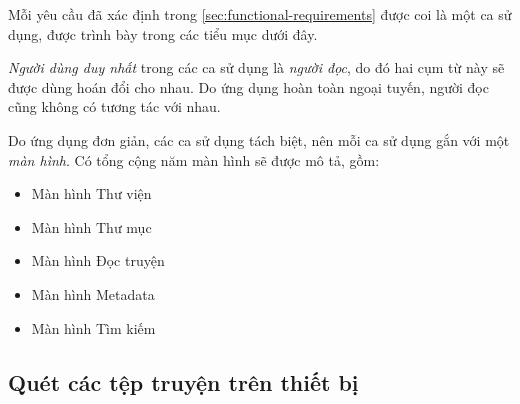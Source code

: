 \documentclass[../../thesis]{subfiles}
\begin{document}
Mỗi yêu cầu đã xác định trong \autoref{sec:functional-requirements} được coi là
một ca sử dụng, được trình bày trong các tiểu mục dưới đây.

\emph{Người dùng duy nhất} trong các ca sử dụng là \emph{người đọc}, do đó hai
cụm từ này sẽ được dùng hoán đổi cho nhau. Do ứng dụng hoàn toàn ngoại tuyến,
người đọc cũng không có tương tác với nhau.

Do ứng dụng đơn giản, các ca sử dụng tách biệt, nên mỗi ca sử dụng gắn với một
\emph{màn hình}. Có tổng cộng năm màn hình sẽ được mô tả, gồm:

\begin{itemize}
    \item
        Màn hình Thư viện
    \item
        Màn hình Thư mục
    \item
        Màn hình Đọc truyện
    \item
        Màn hình Metadata
    \item
        Màn hình Tìm kiếm
\end{itemize}

\subsection{Quét các tệp truyện trên thiết bị}\label{sec:scan}
\end{document}
